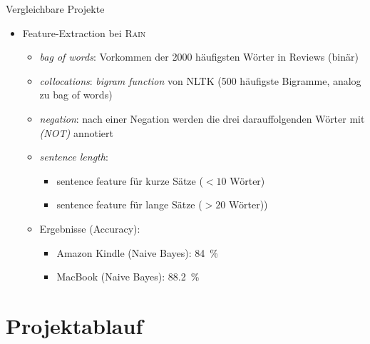 \documentclass[note=hide]{beamer} %
\newcommand{\feature}[1]{\textcolor{dunkelrot}{\emph{#1}}}
\begin{document}
\begin{frame}{Vergleichbare Projekte}
	\begin{itemize}
		\item Feature-Extraction bei \textsc{Rain}
		\begin{itemize}
			\item \feature{bag of words}: Vorkommen der 2000 häufigsten Wörter in Reviews (binär)
			\item \feature{collocations}: \emph{bigram function} von NLTK (500 häufigste Bigramme, analog zu bag of words)
			\item \feature{negation}: nach einer Negation werden die drei darauffolgenden Wörter mit \emph{(NOT)} annotiert
			\item \feature{sentence length}: 
			\begin{itemize}
				\item sentence feature für kurze Sätze ($<10$ Wörter)
				\item sentence feature für lange Sätze ($>20$ Wörter))
			\end{itemize}
		\item Ergebnisse (Accuracy):
			\begin{itemize}
				\item Amazon Kindle (Naive Bayes): \SI{84}{\%}
				\item MacBook (Naive Bayes): \SI{88.2}{\%}
			\end{itemize}
		\end{itemize}
	\end{itemize}
\end{frame}

\section{Projektablauf}
\end{document}
